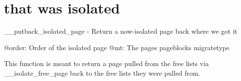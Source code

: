\chapter{that was isolated }
\hypertarget{_page}{}\label{_page}
\+\_\+\+\_\+putback\+\_\+isolated\+\_\+page -\/ Return a now-\/isolated page back where we got it  

@order:\+ Order of the isolated page @mt:\+ The page\textquotesingle{}s pageblock\textquotesingle{}s migratetype

This function is meant to return a page pulled from the free lists via \+\_\+\+\_\+isolate\+\_\+free\+\_\+page back to the free lists they were pulled from. 